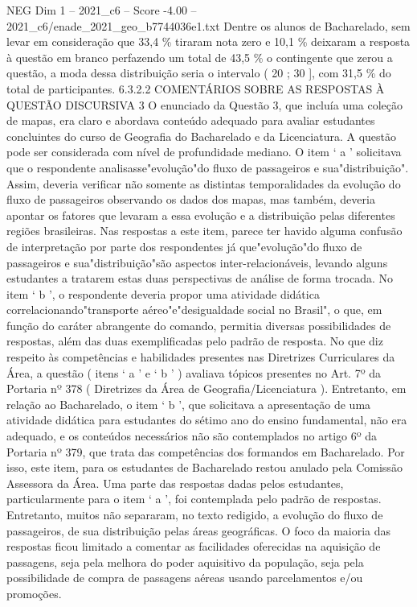 \begin{textsample}{NEG Dim 1 – 2021\_c6 – Score -4.00 – 2021\_c6/enade\_2021\_geo\_b7744036e1.txt}
Dentre os alunos de Bacharelado, sem levar em consideração que 33,4 \% tiraram nota zero e 10,1 \% deixaram a resposta à questão em branco perfazendo um total de 43,5 \% o contingente que zerou a questão, a moda dessa distribuição seria o intervalo ( 20 ; 30 ], com 31,5 \% do total de participantes. 6.3.2.2 COMENTÁRIOS SOBRE AS RESPOSTAS À QUESTÃO DISCURSIVA 3 O enunciado da Questão 3, que incluía uma coleção de mapas, era claro e abordava conteúdo adequado para avaliar estudantes concluintes do curso de Geografia do Bacharelado e da Licenciatura.
A questão pode ser considerada com nível de profundidade mediano.
O item ‘ a ’ solicitava que o respondente analisasse"evolução"do fluxo de passageiros e sua"distribuição".
Assim, deveria verificar não somente as distintas temporalidades da evolução do fluxo de passageiros observando os dados dos mapas, mas também, deveria apontar os fatores que levaram a essa evolução e a distribuição pelas diferentes regiões brasileiras.
Nas respostas a este item, parece ter havido alguma confusão de interpretação por parte dos respondentes já que"evolução"do fluxo de passageiros e sua"distribuição"são aspectos inter-relacionáveis, levando alguns estudantes a tratarem estas duas perspectivas de análise de forma trocada.
No item ‘ b ’, o respondente deveria propor uma atividade didática correlacionando"transporte aéreo"e"desigualdade social no Brasil", o que, em função do caráter abrangente do comando, permitia diversas possibilidades de respostas, além das duas exemplificadas pelo padrão de resposta.
No que diz respeito às competências e habilidades presentes nas Diretrizes Curriculares da Área, a questão ( itens ‘ a ’ e ‘ b ’ ) avaliava tópicos presentes no Art. 7º da Portaria nº 378 ( Diretrizes da Área de Geografia/Licenciatura ).
Entretanto, em relação ao Bacharelado, o item ‘ b ’, que solicitava a apresentação de uma atividade didática para estudantes do sétimo ano do ensino fundamental, não era adequado, e os conteúdos necessários não são contemplados no artigo 6º da Portaria nº 379, que trata das competências dos formandos em Bacharelado.
Por isso, este item, para os estudantes de Bacharelado restou anulado pela Comissão Assessora da Área.
Uma parte das respostas dadas pelos estudantes, particularmente para o item ‘ a ’, foi contemplada pelo padrão de respostas.
Entretanto, muitos não separaram, no texto redigido, a evolução do fluxo de passageiros, de sua distribuição pelas áreas geográficas.
O foco da maioria das respostas ficou limitado a comentar as facilidades oferecidas na aquisição de passagens, seja pela melhora do poder aquisitivo da população, seja pela possibilidade de compra de passagens aéreas usando parcelamentos e/ou promoções.

\end{textsample}
